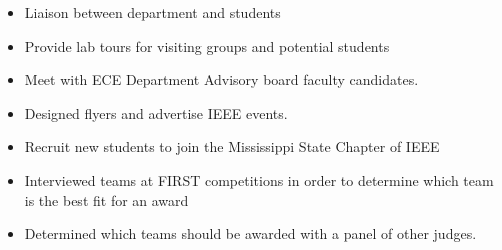 \documentclass[10pt,a4paper]{altacv}
\begin{document}
\begin{itemize}
\item Liaison between department and students
\item Provide lab tours for visiting groups and potential students 
\item Meet with ECE Department Advisory board faculty candidates.
\end{itemize}

\begin{itemize}
\item Designed flyers and advertise IEEE events. 
\item Recruit new students to join the Mississippi State Chapter of IEEE
\end{itemize}

\begin{itemize}
    \item Interviewed teams at FIRST competitions in order to determine which team is the best fit for an award
    \item Determined which teams should be awarded with a panel of other judges. 
\end{itemize}







\clearpage
\end{document}
